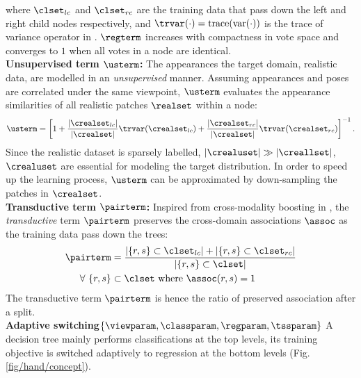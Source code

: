 where $\clset_{lc}$ and $\clset_{rc}$ are the training data that pass down the left and right child nodes respectively, and $\trvar(\cdot) = \mathrm{trace}(\mathrm{var}(\cdot))$ is the trace of variance operator in \cite{Gall2011}. 
$\regterm$ increases with compactness in vote space and converges to $1$ when all votes in a node are identical. \\ 
\textbf{Unsupervised term $\usterm$:} The appearances the target domain, \ie realistic data, are modelled in an \emph{unsupervised} manner. 
Assuming appearances and poses are correlated under the same viewpoint, $\usterm$ evaluates the appearance similarities of all realistic patches $\realset$ within a node:    
\begin{equation}
	\usterm = \left[ 1 + 
	\frac{|\crealset_{lc}|}{|\crealset|} \trvar(\crealset_{lc}) +  
\frac{|\crealset_{rc}|}{|\crealset|} \trvar(\crealset_{rc}) \right]^{-1}.  
	\label{eq:usterm}
\end{equation}
Since the realistic dataset is sparsely labelled, \ie$|\crealuset| \gg |\creallset|$, $\crealuset$ are essential for modeling the target distribution. 
In order to speed up the learning process, $\usterm$ can be approximated by down-sampling the patches in $\crealset$. \\  
\textbf{Transductive term $\pairterm$:} 
Inspired from cross-modality boosting in \cite{Bronstein2010}, 
the \emph{transductive} term $\pairterm$ preserves the cross-domain associations $\assoc$ as the training data pass down the trees: 
\begin{equation}
	\begin{split}
	\pairterm &= 
	\frac{|\{r,s\} \subset \clset_{lc}| +  
	|\{r,s\} \subset \clset_{rc}|}{|\{r,s\} \subset \clset|} \\   
	\forall\ \{r,s\} &\subset \clset \mbox{ where } \assoc(r,s) = 1
	\end{split}
	\label{eq:pairterm}
\end{equation}
The transductive term $\pairterm$ is hence the ratio of preserved association after a split. \\
\textbf{Adaptive switching$\{\viewparam, \classparam, \regparam, \tssparam\}$} 
A decision tree mainly performs classifications at the top levels, its training objective is switched adaptively to regression at the bottom levels (Fig. \ref{fig/hand/concept}). 
